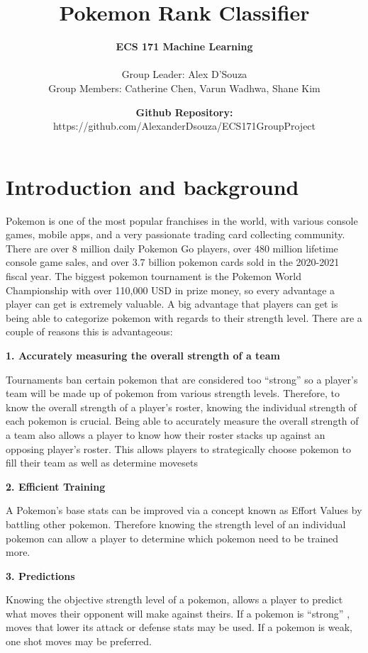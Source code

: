 \documentclass[11pt, letterpaper]{report}
\title{\textbf{Pokemon Rank Classifier}}
\author{\textbf{ECS 171 Machine Learning} \\\\Group Leader: Alex D'Souza \\ Group Members: Catherine Chen, Varun Wadhwa, Shane Kim}
\date{\textbf{Github Repository: }https://github.com/AlexanderDsouza/ECS171GroupProject}
\begin{document}
    \maketitle
\chapter{Introduction and background}
Pokemon is one of the most popular franchises in the world, with various console games, mobile apps, and a very passionate trading card collecting community. There are over 8 million daily Pokemon Go players, over 480 million lifetime console game sales, and over 3.7 billion pokemon cards sold in the 2020-2021 fiscal year. The biggest pokemon tournament is the Pokemon World Championship with over 110,000 USD in prize money, so every advantage a player can get is extremely valuable. A big advantage that players can get is being able to categorize pokemon with regards to their strength level. There are a couple of reasons this is advantageous: 

\begin{center}
\textbf{1. Accurately measuring the overall strength of a team}
\end{center}
Tournaments ban certain pokemon that are considered too “strong” so a player’s team will be made up of pokemon from various strength levels. Therefore, to know the overall strength of a player’s roster, knowing the individual strength of each pokemon is crucial. Being able to accurately measure the overall strength of a team also allows a player to know how their roster stacks up against an opposing player’s roster. This allows players to strategically choose pokemon to fill their team as well as determine movesets 

\begin{center}
\textbf{2. Efficient Training}
\end{center}
A Pokemon’s base stats can be improved via a concept known as Effort Values by battling other pokemon. Therefore knowing the strength level of an individual pokemon can allow a player to determine which pokemon need to be trained more.\\

\begin{center}
\textbf{3. Predictions}
\end{center}
Knowing the objective strength level of a pokemon, allows a player to predict what moves their opponent will make against theirs. If a pokemon is “strong” , moves that lower its attack or defense stats may be used. If a pokemon is weak, one shot moves may be preferred.\\ 
\end{document}
